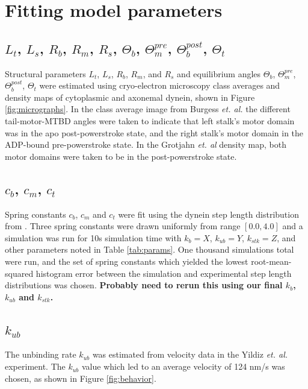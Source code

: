 \documentclass[9pt,twocolumn,twoside]{article}
\begin{document}

\section*{Fitting model parameters}

\subsection*{$L_t$, $L_s$, $R_b$, $R_m$, $R_s$, $\Theta_{b}$, $\Theta_{m}^{pre}$, $\Theta_{b}^{post}$, $\Theta_{t}$}
Structural parameters $L_t$, $L_s$, $R_b$, $R_m$, and $R_s$ and equilibrium angles $\Theta_{b}$, $\Theta_{m}^{pre}$, $\Theta_{b}^{post}$, $\Theta_{t}$ were estimated using cryo-electron microscopy class averages and density maps of cytoplasmic and axonemal dynein, shown in Figure \ref{fig:micrographs}. In the class average image from Burgess \textit{et. al.} \cite{burgess} the different tail-motor-MTBD angles were taken to indicate that left stalk's motor domain was in the apo post-powerstroke state, and the right stalk's motor domain in the ADP-bound pre-powerstroke state. In the Grotjahn \textit{et. al} \cite{grotjahn} density map, both motor domains were taken to be in the post-powerstroke state.

\subsection*{$c_b$, $c_m$, $c_t$}
Spring constants $c_b$, $c_m$ and $c_t$ were fit using the dynein step length distribution from \cite{yildizpaper}. Three spring constants were drawn uniformly from range $[0.0, 4.0]$ and a simulation was run for 10s simulation time with $k_b=X$, $k_{ub}=Y$, $k_{stk}=Z$, and other parameters noted in Table \ref{tab:params}. One thousand simulations total were run, and the set of spring constants which yielded the lowest root-mean-squared histogram error between the simulation and experimental step length distributions was chosen. \textbf{Probably need to rerun this using our final $k_b$, $k_{ub}$ and $k_{stk}$.}

\subsection*{$k_{ub}$}
The unbinding rate $k_{ub}$ was estimated from velocity data in the Yildiz \textit{et. al.} experiment. The $k_{ub}$ value which led to an average velocity of 124 nm/s was chosen, as shown in Figure \ref{fig:behavior}.
\end{document}
